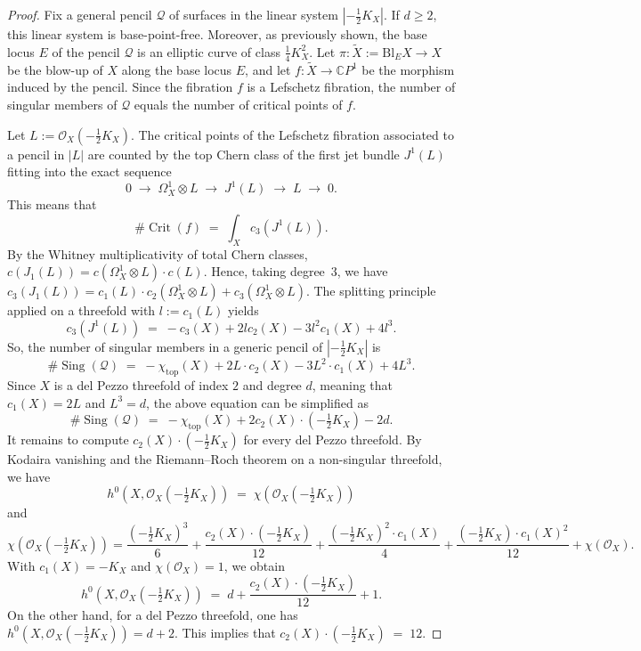 \documentclass[10pt,a4paper]{article}
\numberwithin{equation}{section}
\theoremstyle{definition}
\theoremstyle{plain}
\theoremstyle{remark}
\DeclareMathOperator{\Crit}{Crit}
\DeclareMathOperator{\Sing}{Sing}
\begin{document}
\begin{proof}
 Fix  a general pencil $\mathcal{Q}$ of surfaces in the linear system $|-\frac{1}{2}K_X|$. If $d\ge 2$, this linear system  is base-point-free.  Moreover, as previously shown, the base locus $E$ of the pencil $\mathcal{Q}$ is an elliptic curve of class $\frac{1}{4}K_X^2$. Let $\pi\colon \widetilde X:=\mathrm{Bl}_E X\to X$ be the blow-up of $X$ along the base locus $E$, and let
$f\colon \widetilde X\to\mathbb{C} P^1$ be the morphism induced by the pencil. Since the fibration $f$ is a Lefschetz fibration, the number of singular members of $\mathcal{Q}$ equals the number of critical points of $f$.

Let $L:=\mathcal O_X(-\frac{1}{2}K_X)$. The critical points of the Lefschetz fibration associated to a pencil in
$|L|$ are counted by the top Chern class of the first jet bundle $J^1(L)$ fitting into the exact sequence
\[
0 \;\longrightarrow\; \Omega_X^1 \otimes L \;\longrightarrow\; J^1(L) \;\longrightarrow\; L \;\longrightarrow\; 0.
\]
This means that
\[
\#\Crit(f)\;=\;\int_X c_3\left(J^1(L)\right).
\]
By the Whitney multiplicativity of total Chern classes, $c(J_1(L))=c(\Omega_X^1\otimes L)\cdot c(L)$. Hence, taking degree~$3$, we have $c_3(J_1(L))=c_1(L)\cdot c_2(\Omega_X^1\otimes L)+c_3(\Omega_X^1\otimes L)$.
The splitting principle applied on a threefold with $l:=c_1(L)$ yields
\[
c_3\left(J^1(L)\right)
\;=\;-c_3(X)+2lc_2(X)-3l^2c_1(X)+4l^3.
\]
So, the number of singular members in a generic pencil of $|-\frac{1}{2}K_X|$ is
\begin{equation*}
\#\Sing(\mathcal{Q})\;=\;-\chi_\mathrm{top}(X)+2L\cdot c_2(X)-3L^2\cdot c_1(X)+4L^3.
\end{equation*}
Since $X$ is a del Pezzo threefold of index $2$ and degree $d$, meaning that $c_1(X)=2L$ and $L^3=d$, the above equation can be simplified as
\begin{equation}\label{eq:discriminant}
\#\Sing(\mathcal{Q})\;=\;-\chi_\mathrm{top}(X)+2c_2(X)\cdot  \left(-\tfrac{1}{2}K_X\right)-2d.
\end{equation}
It remains to compute $c_2(X)\cdot (-\frac{1}{2}K_X)$ for every del Pezzo threefold. By Kodaira vanishing and the Riemann--Roch theorem on a  non-singular threefold, we have 
\[
h^0\left(X,\mathcal O_X\left(-\tfrac{1}{2}K_X\right)\right)\;=\;\chi\left(\mathcal O_X\left(-\tfrac{1}{2}K_X\right)\right)
\]
and
\[
\chi\left(\mathcal O_X\left(-\tfrac{1}{2}K_X\right)\right)
= \frac{\left(-\frac{1}{2}K_X\right)^3}{6}+\frac{c_2(X)\cdot \left(-\frac{1}{2}K_X\right)}{12}+\frac{\left(-\frac{1}{2}K_X\right)^2\cdot c_1(X)}{4}
+\frac{\left(-\frac{1}{2}K_X\right)\cdot c_1(X)^2}{12}+\chi(\mathcal O_X).
\]
With $c_1(X)=-K_X$ and $\chi(\mathcal O_X)=1$, we obtain
\[
h^0\left(X,\mathcal O_X\left(-\tfrac{1}{2}K_X\right)\right)\;=\; d + \frac{c_2(X)\cdot \left(-\frac{1}{2}K_X\right)}{12} + 1.
\]
On the other hand, for a del Pezzo threefold, one has $h^0(X,\mathcal O_X(-\frac{1}{2}K_X))=d+2$. This implies that $c_2(X)\cdot (-\frac{1}{2}K_X) \;=\; 12$.


\end{proof}
\end{document}
